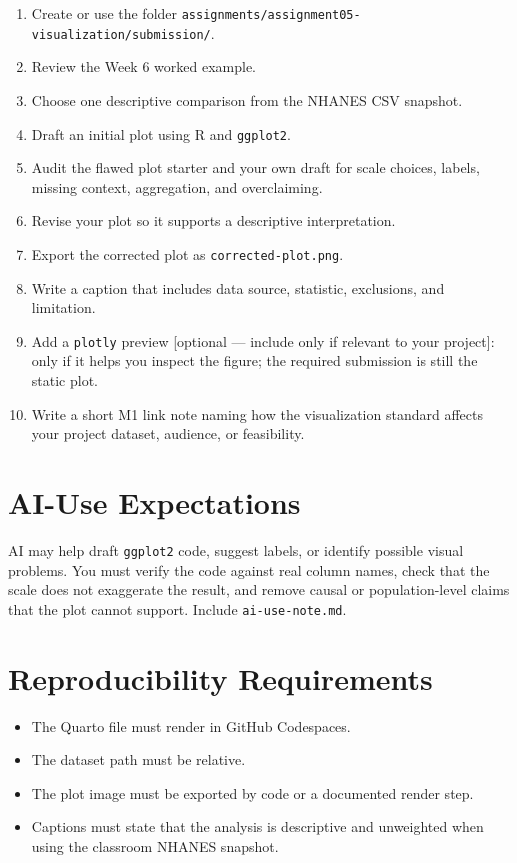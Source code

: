 \documentclass[
  letterpaper,
  DIV=11,
  numbers=noendperiod,
  oneside]{scrreprt}
\providecommand{\tightlist}{%
  \setlength{\itemsep}{0pt}\setlength{\parskip}{0pt}}
\begin{document}
\begin{enumerate}
\def\labelenumi{\arabic{enumi}.}
\tightlist
\item
  Create or use the folder
  \texttt{assignments/assignment05-visualization/submission/}.
\item
  Review the Week 6 worked example.
\item
  Choose one descriptive comparison from the NHANES CSV snapshot.
\item
  Draft an initial plot using R and \texttt{ggplot2}.
\item
  Audit the flawed plot starter and your own draft for scale choices,
  labels, missing context, aggregation, and overclaiming.
\item
  Revise your plot so it supports a descriptive interpretation.
\item
  Export the corrected plot as \texttt{corrected-plot.png}.
\item
  Write a caption that includes data source, statistic, exclusions, and
  limitation.
\item
  Add a \texttt{plotly} preview {[}optional --- include only if relevant
  to your project{]}: only if it helps you inspect the figure; the
  required submission is still the static plot.
\item
  Write a short M1 link note naming how the visualization standard
  affects your project dataset, audience, or feasibility.
\end{enumerate}

\section{AI-Use Expectations}\label{ai-use-expectations-4}

AI may help draft \texttt{ggplot2} code, suggest labels, or identify
possible visual problems. You must verify the code against real column
names, check that the scale does not exaggerate the result, and remove
causal or population-level claims that the plot cannot support. Include
\texttt{ai-use-note.md}.

\section{Reproducibility
Requirements}\label{reproducibility-requirements-4}

\begin{itemize}
\tightlist
\item
  The Quarto file must render in GitHub Codespaces.
\item
  The dataset path must be relative.
\item
  The plot image must be exported by code or a documented render step.
\item
  Captions must state that the analysis is descriptive and unweighted
  when using the classroom NHANES snapshot.
\end{itemize}
\end{document}
